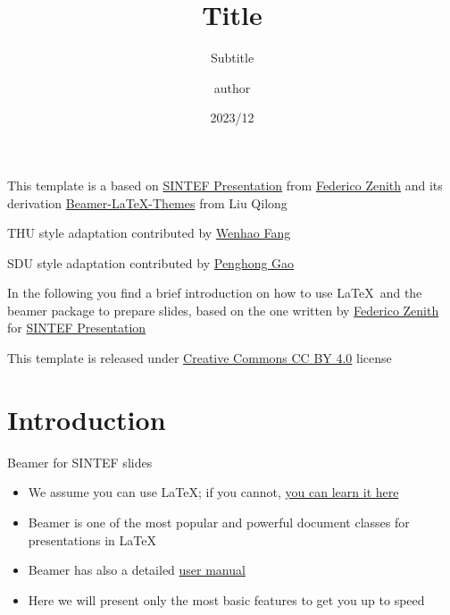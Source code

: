 \documentclass{beamer}
\title{Title}
\subtitle{Subtitle}
\author{author}
\date{2023/12}
\newcommand{\hrefcol}[2]{\textcolor{cyan}{\href{#1}{#2}}}
\begin{document}
\maketitle

\begin{frame}

This template is a based on \hrefcol{https://www.overleaf.com/latex/templates/sintef-presentation/jhbhdffczpnx}{SINTEF Presentation} from \hrefcol{mailto:federico.zenith@sintef.no}{Federico Zenith} and its derivation \hrefcol{https://github.com/TOB-KNPOB/Beamer-LaTeX-Themes}{Beamer-LaTeX-Themes} from Liu Qilong

\vspace{\baselineskip}

THU style adaptation contributed by \hrefcol{https://github.com/FangWHao}{Wenhao Fang}

SDU style adaptation contributed by \hrefcol{https://github.com/almostgph}{Penghong Gao}


\vspace{\baselineskip}

In the following you find a brief introduction on how to use \LaTeX\ and the beamer package to prepare slides, based on the one written by \hrefcol{mailto:federico.zenith@sintef.no}{Federico Zenith} for \hrefcol{https://www.overleaf.com/latex/templates/sintef-presentation/jhbhdffczpnx}{SINTEF Presentation}

\vspace{\baselineskip}

This template is released under \hrefcol{https://creativecommons.org/licenses/by-nc/4.0/legalcode}{Creative Commons CC BY 4.0} license

\end{frame}

\section{Introduction}

\begin{frame}{Beamer for SINTEF slides}
\begin{itemize}
\item We assume you can use \LaTeX; if you cannot,
\hrefcol{http://en.wikibooks.org/wiki/LaTeX/}{you can learn it here}
\item Beamer is one of the most popular and powerful document
classes for presentations in \LaTeX
\item Beamer has also a detailed
\hrefcol{http://www.ctan.org/tex-archive/macros/latex/contrib/beamer/doc/beameruserguide.pdf}{user
 manual}
\item Here we will present only the most basic features to get you up to speed
\end{itemize}
\end{frame}
\end{document}
